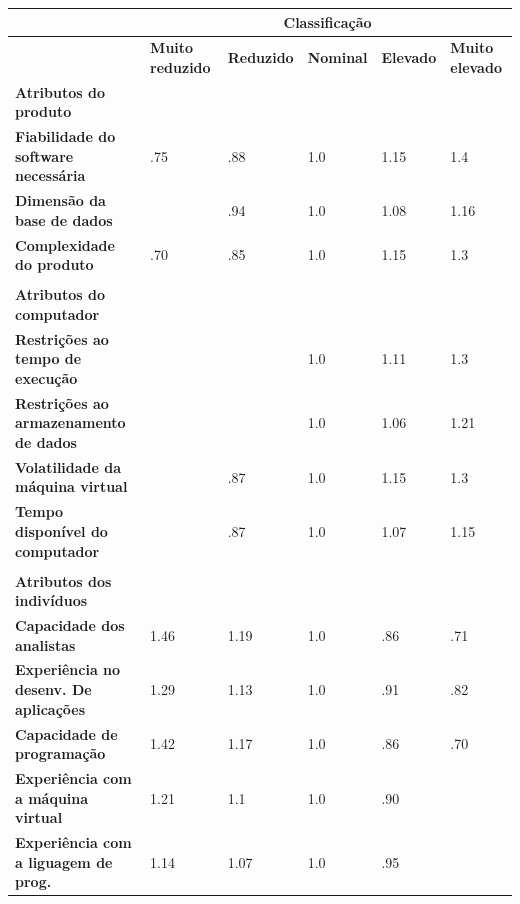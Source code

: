 \documentclass[a4paper]{report}
\begin{document}
\begin{table}[h]
\centering
\begin{adjustbox}{width=1\textwidth}
\begin{tabular}{|l|l|l|l|l|l|}
\hline
 & \multicolumn{5}{c|}{\textbf{Classificação}} \\ \hline
 & \textbf{Muito reduzido} & \textbf{Reduzido} & \textbf{Nominal} & \textbf{Elevado} & \textbf{Muito elevado} \\ \hline
\textbf{Atributos do produto} &  &  &  &  &  \\ \hline
\textbf{Fiabilidade do software necessária} & .75 & .88 & \cellcolor[HTML]{FFFE65}1.0 & 1.15 & 1.4 \\ \hline
\textbf{Dimensão da base de dados} &  & \cellcolor[HTML]{FFFE65}.94 & 1.0 & 1.08 & 1.16 \\ \hline
\textbf{Complexidade do produto} & .70 & .85 & 1.0 & \cellcolor[HTML]{FFFE65}1.15 & 1.3 \\ \hline
 &  &  &  &  &  \\ \hline
\textbf{Atributos do computador} &  &  &  &  &  \\ \hline
\textbf{Restrições ao tempo de execução} &  &  & \cellcolor[HTML]{FFFE65}1.0 & 1.11 & 1.3 \\ \hline
\textbf{Restrições ao armazenamento de dados} &  &  & \cellcolor[HTML]{FFFE65}1.0 & 1.06 & 1.21 \\ \hline
\textbf{Volatilidade da máquina virtual} &  & \cellcolor[HTML]{FFFE65}.87 & 1.0 & 1.15 & 1.3 \\ \hline
\textbf{Tempo disponível do computador} &  & .87 & \cellcolor[HTML]{FFFE65}1.0 & 1.07 & 1.15 \\ \hline
 &  &  &  &  &  \\ \hline
\textbf{Atributos dos indivíduos} &  &  &  &  &  \\ \hline
\textbf{Capacidade dos analistas} & 1.46 & 1.19 & 1.0 & \cellcolor[HTML]{FFFE65}.86 & .71 \\ \hline
\textbf{Experiência no desenv. De aplicações} & 1.29 & 1.13 & \cellcolor[HTML]{FFFE65}1.0 & .91 & .82 \\ \hline
\textbf{Capacidade de programação} & 1.42 & 1.17 & \cellcolor[HTML]{FFFE65}1.0 & .86 & .70 \\ \hline
\textbf{Experiência com a máquina virtual} & 1.21 & 1.1 & \cellcolor[HTML]{FFFE65}1.0 & .90 &  \\ \hline
\textbf{Experiência com a liguagem de prog.} & 1.14 & 1.07 & \cellcolor[HTML]{FFFE65}1.0 & .95 &  \\ \hline

\end{tabular}
\end{adjustbox}
\end{table}
\end{document}
